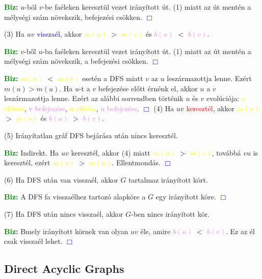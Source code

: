 \documentclass[../szamtud.tex]{subfiles}
\begin{document}
        \textcolor{green}{\textbf{Biz:}} $u$-ból $v$-be faéleken keresztül vezet irányított út. (1) miatt az út mentén a mélységi szám növekszik, befejezési csökken.  \textcolor{blue}{$\Box$}

        (3) Ha $uv$ \textcolor{blue}{visszaél}, akkor \textcolor{yellow}{$m(u)$} $>$ \textcolor{yellow}{$m(v)$} és \textcolor{violet}{$b(u)$} $<$ \textcolor{violet}{$b(v)$}.

        \textcolor{green}{\textbf{Biz:}} $v$-ből $u$-ba faéleken keresztül vezet irányított út. (1) miatt az út mentén a mélységi szám növekszik, a befejezési csökken.  \textcolor{blue}{$\Box$}

        \textcolor{green}{\textbf{Biz:}} \textcolor{yellow}{$m(u)$} $<$ \textcolor{yellow}{$m(v)$} esetén a DFS miatt $v$ az $u$ leszármazottja lenne. Ezért $m(u) > m(u)$. Ha $u$-t a $v$ befejezése előtt érnénk el, akkor $u$ a $v$ leszármazottja lenne. Ezért az alábbi sorrendben történik $u$ és $v$ evolúciója: \textcolor{yellow}{v elérése}, \textcolor{violet}{v befejezése}, \textcolor{yellow}{u elérése}, \textcolor{violet}{u befejezése}.  \textcolor{blue}{$\Box$}
        (4) Ha $uv$ \textcolor{red}{keresztél}, akkor \textcolor{yellow}{$m(u)$} $>$ \textcolor{yellow}{$m(v)$} és \textcolor{violet}{$b(u)$} $>$ \textcolor{violet}{$b(v)$}.

        (5) Irányítatlan gráf DFS bejárása után nincs keresztél.

        \textcolor{green}{\textbf{Biz:}} Indirekt. Ha $uv$ keresztél, akkor (4) miatt \textcolor{yellow}{$m(u)$} $>$ \textcolor{yellow}{$m(v)$}, továbbá $vu$ is keresztél, ezért \textcolor{yellow}{$m(v)$} $>$ \textcolor{yellow}{$m(u)$}. Ellentmondás.  \textcolor{blue}{$\Box$}

        (6) Ha DFS után van visszaél, akkor $G$ tartalmaz irányított kört.

        \textcolor{green}{\textbf{Biz:}} A DFS fa visszaélhez tartozó alapköre a $G$ egy irányított köre.  \textcolor{blue}{$\Box$}

        (7) Ha DFS után nincs visszaél, akkor $G$-ben nincs irányított kör.

        \textcolor{green}{\textbf{Biz:}} Bmely irányított körnek van olyan $uv$ éle, amire \textcolor{violet}{$b(u)$} $<$ \textcolor{violet}{$b(v)$}. Ez az él csak visszaél lehet.  \textcolor{blue}{$\Box$} 

    \subsection{Direct Acyclic Graphs}
\end{document}
